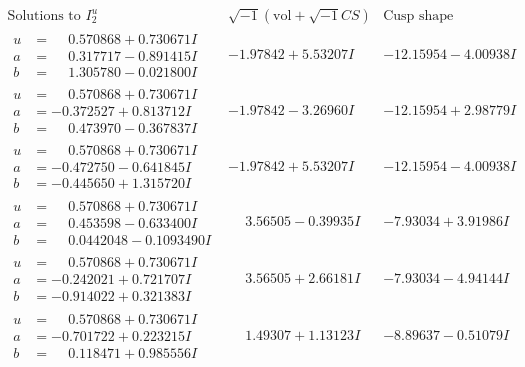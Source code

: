 \documentclass[1p]{elsarticle_modified}
\theoremstyle{definition}
\newcommand{\I}{\sqrt{-1}}
\begin{document}
$$\begin{array}{c|c|c}  
\text{Solutions to }I^u_{2}& \I (\text{vol} + \sqrt{-1}CS) & \text{Cusp shape}\\
 \hline 
\begin{aligned}
u &= \phantom{-}0.570868 + 0.730671 I \\
a &= \phantom{-}0.317717 - 0.891415 I \\
b &= \phantom{-}1.305780 - 0.021800 I\end{aligned}
 & -1.97842 + 5.53207 I & -12.15954 - 4.00938 I \\ \hline\begin{aligned}
u &= \phantom{-}0.570868 + 0.730671 I \\
a &= -0.372527 + 0.813712 I \\
b &= \phantom{-}0.473970 - 0.367837 I\end{aligned}
 & -1.97842 - 3.26960 I & -12.15954 + 2.98779 I \\ \hline\begin{aligned}
u &= \phantom{-}0.570868 + 0.730671 I \\
a &= -0.472750 - 0.641845 I \\
b &= -0.445650 + 1.315720 I\end{aligned}
 & -1.97842 + 5.53207 I & -12.15954 - 4.00938 I \\ \hline\begin{aligned}
u &= \phantom{-}0.570868 + 0.730671 I \\
a &= \phantom{-}0.453598 - 0.633400 I \\
b &= \phantom{-}0.0442048 - 0.1093490 I\end{aligned}
 & \phantom{-}3.56505 - 0.39935 I & -7.93034 + 3.91986 I \\ \hline\begin{aligned}
u &= \phantom{-}0.570868 + 0.730671 I \\
a &= -0.242021 + 0.721707 I \\
b &= -0.914022 + 0.321383 I\end{aligned}
 & \phantom{-}3.56505 + 2.66181 I & -7.93034 - 4.94144 I \\ \hline\begin{aligned}
u &= \phantom{-}0.570868 + 0.730671 I \\
a &= -0.701722 + 0.223215 I \\
b &= \phantom{-}0.118471 + 0.985556 I\end{aligned}
 & \phantom{-}1.49307 + 1.13123 I & -8.89637 - 0.51079 I \\ \hline\begin{aligned}

\end{aligned}
\end{array}$$
\end{document}
